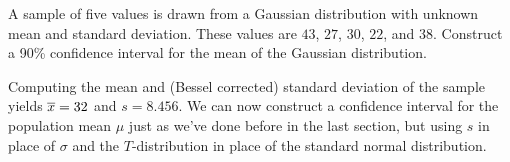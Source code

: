 \begin{example}\label{TIntExample} A sample of five values is drawn from a Gaussian distribution with unknown mean and standard deviation. These values are $43$, $27$, $30$, $22$, and $38$. Construct a 90\% confidence interval for the mean of the Gaussian distribution.

Computing the mean and (Bessel corrected) standard deviation of the sample yields ${\overline{x}} = 32$ and $s = 8.456$. We can now construct a confidence interval for the population mean $\mu$ just as we've done before in the last section, but using $s$ in place of $\sigma$ and the $T$-distribution in place of the standard normal distribution.
\begin{center}
\end{center}


\end{example}
